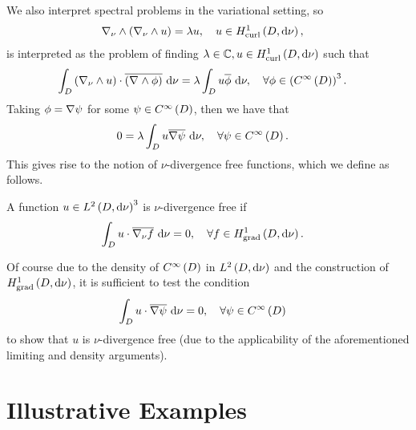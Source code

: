 We also interpret spectral problems in the variational setting, so 
\begin{align*}
	\nabla_{\nu}\wedge\left( \nabla_{\nu}\wedge u \right) &= \lambda u, \quad u\in H^1_\mathrm{curl}\left( D, \mathrm{d}\nu \right),
\end{align*}
is interpreted as the problem of finding $\lambda\in\mathbb{C}, u\in H^1_\mathrm{curl}\left( D, \mathrm{d}\nu \right)$ such that
\begin{align*}
	\int_{D} \left( \nabla_{\nu}\wedge u \right)\cdot\overline{\left( \nabla_{}\wedge\phi \right)}  \ \mathrm{d}\nu &= \lambda \int_{D} u\overline{\phi}  \ \mathrm{d}\nu, \quad \forall\phi\in\left( C^{\infty}\left( D \right) \right)^3.
\end{align*}
Taking $\phi = \nabla\psi$ for some $\psi\in C^{\infty}\left( D \right)$, then we have that
\begin{align*}
	0 &= \lambda \int_{D} u\overline{\nabla\psi} \ \mathrm{d}\nu, \quad \forall \psi\in C^{\infty}\left( D \right).
\end{align*}
This gives rise to the notion of $\nu$-divergence free functions, which we define as follows.
\begin{definition}
	A function $u\in L^{2}\left( D,\mathrm{d}\nu \right)^3$ is $\nu$-divergence free if
	\begin{align*}
		\int_{D} u\cdot\overline{\nabla_{\nu}f}  \ \mathrm{d}\nu &= 0, \quad \forall f\in H^1_\mathrm{grad}\left( D, \mathrm{d}\nu \right).
	\end{align*}	 
\end{definition}
Of course due to the density of $C^{\infty}\left( D \right)$ in $L^{2}\left( D,\mathrm{d}\nu \right)$ and the construction of $H^1_\mathrm{grad}\left( D, \mathrm{d}\nu \right)$, it is sufficient to test the condition
\begin{align*}
	\int_{D} u\cdot\overline{\nabla\psi}  \ \mathrm{d}\nu &= 0, \quad \forall \psi\in C^{\infty}\left( D \right)
\end{align*}
to show that $u$ is $\nu$-divergence free (due to the applicability of the aforementioned limiting and density arguments).


\section{Illustrative Examples} \label{sec:CurlExamples}

